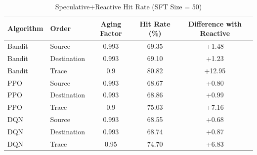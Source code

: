 \begin{table}[ht]
\centering
\caption{Speculative+Reactive Hit Rate (SFT Size = 50)}
\label{tab:speculativereactive-hitrate-50}
\begin{tabular}{llccc}
\toprule
Algorithm & Order & Aging Factor & Hit Rate (\%) & Difference with Reactive \\
\midrule
Bandit & Source & 0.993 & 69.35 & +1.48 \\
Bandit & Destination & 0.993 & 69.10 & +1.23 \\
Bandit & Trace & 0.9 & 80.82 & +12.95 \\
PPO & Source & 0.993 & 68.67 & +0.80 \\
PPO & Destination & 0.993 & 68.86 & +0.99 \\
PPO & Trace & 0.9 & 75.03 & +7.16 \\
DQN & Source & 0.993 & 68.55 & +0.68 \\
DQN & Destination & 0.993 & 68.74 & +0.87 \\
DQN & Trace & 0.95 & 74.70 & +6.83 \\
\bottomrule
\end{tabular}
\end{table}

